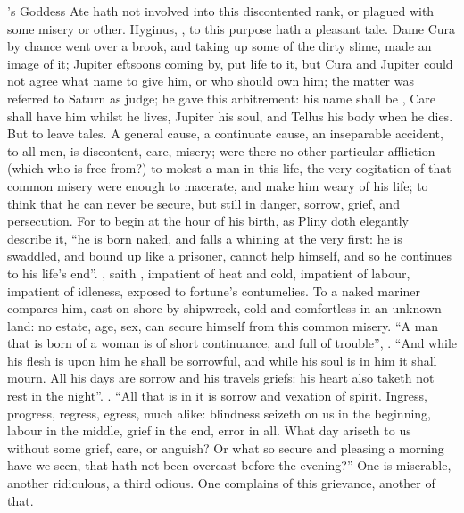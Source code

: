\Homer{}'s Goddess Ate hath not involved into this discontented
rank, or plagued with some misery or other. Hyginus,
, to this purpose hath a pleasant tale. Dame
Cura by chance went over a brook, and taking up some of the dirty slime, made
an image of it; Jupiter eftsoons coming by, put life to it, but Cura and
Jupiter could not agree what name to give him, or who should own him; the
matter was referred to Saturn as judge; he gave this arbitrement: his name
shall be , Care shall have
him whilst he lives, Jupiter his soul, and Tellus his body when he dies. But to
leave tales. A general cause, a continuate cause, an inseparable accident, to
all men, is discontent, care, misery; were there no other particular affliction
(which who is free from?) to molest a man in this life, the very cogitation of
that common misery were enough to macerate, and make him weary of his life; to
think that he can never be secure, but still in danger, sorrow, grief, and
persecution. For to begin at the hour of his birth, as
Pliny doth elegantly describe it, \enquote{he is born naked, and
falls a whining at the very first: he is swaddled, and
bound up like a prisoner, cannot help himself, and so he continues to his
life's end}. , saith \Seneca{},
impatient of heat and cold, impatient of labour, impatient of idleness, exposed
to fortune's contumelies. To a naked mariner \Lucretius{} compares him, cast on
shore by shipwreck, cold and comfortless in an unknown land:
no estate, age, sex, can secure himself from this common
misery. \enquote{A man that is born of a woman is of short continuance, and full of
trouble}, . \enquote{And while his flesh is upon him he
shall be sorrowful, and while his soul is in him it shall mourn. All his days
are sorrow and his travels griefs: his heart also taketh not rest in the
night}. . \enquote{All that is in it is
sorrow and vexation of spirit. Ingress, progress, regress,
egress, much alike: blindness seizeth on us in the beginning, labour in the
middle, grief in the end, error in all. What day ariseth to us without some
grief, care, or anguish? Or what so secure and pleasing a morning have we seen,
that hath not been overcast before the evening?} One is miserable, another
ridiculous, a third odious. One complains of this grievance, another of that.

